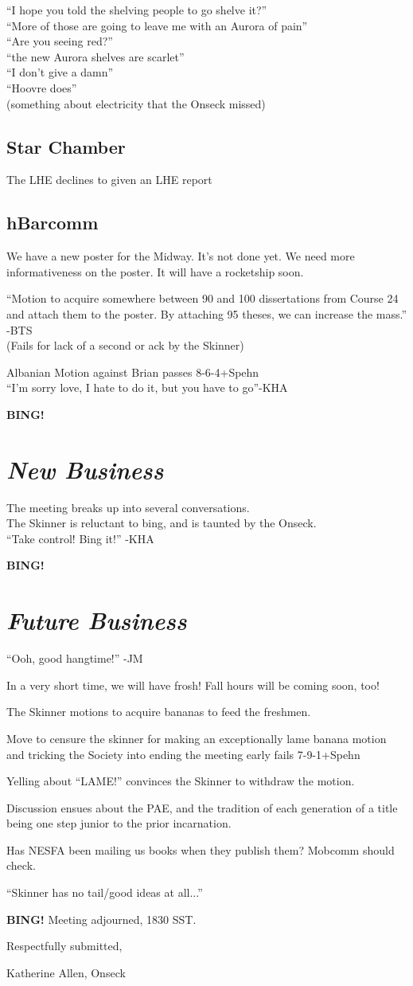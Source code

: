 \documentclass[10pt]{article}
\newcommand{\bing}{{\bf BING!} }
\newcommand{\goto}[1]{\bing \vskip 12pt \section*{{\em{#1}}}}
\begin{document}
``I hope you told the shelving people to go shelve it?''\\
``More of those are going to leave me with an Aurora of pain''\\
``Are you seeing red?''\\
``the new Aurora shelves are scarlet''\\
``I don't give a damn''\\
``Hoovre does''\\
(something about electricity that the Onseck missed)

\subsection*{Star Chamber}
The LHE declines to given an LHE report

\subsection*{hBarcomm}
We have a new poster for the Midway. It's not done yet.
We need more informativeness on the poster.
It will have a rocketship soon.

``Motion to acquire somewhere between 90 and 100 dissertations from
Course 24 and attach them to the poster.  By attaching 95 theses, we
can increase the mass.''  -BTS\\
(Fails for lack of a second or ack by the Skinner)

Albanian Motion against Brian passes 8-6-4+Spehn\\
``I'm sorry love, I hate to do it, but you have to go''-KHA

\goto{New Business}
The meeting breaks up into several conversations. \\
The Skinner is reluctant to bing, and is taunted by the Onseck.\\
``Take control! Bing it!'' -KHA

\goto{Future Business}
``Ooh, good hangtime!'' -JM

In a very short time, we will have frosh!
Fall hours will be coming soon, too!

The Skinner motions to acquire bananas to feed the freshmen.

Move to censure the skinner for making an exceptionally lame banana
motion and tricking the Society into ending the meeting early fails 7-9-1+Spehn

Yelling about ``LAME!'' convinces the Skinner to withdraw the motion.

Discussion ensues about the PAE, and the tradition of each generation
of a title being one step junior to the prior incarnation.

Has NESFA been mailing us books when they publish them? Mobcomm should check.

``Skinner has no tail/good ideas at all...''

\bing
\noindent
Meeting adjourned, 1830 SST.

\vspace{18pt}

\centerline{Respectfully submitted,}
\centerline{Katherine Allen, Onseck}
\end{document}
